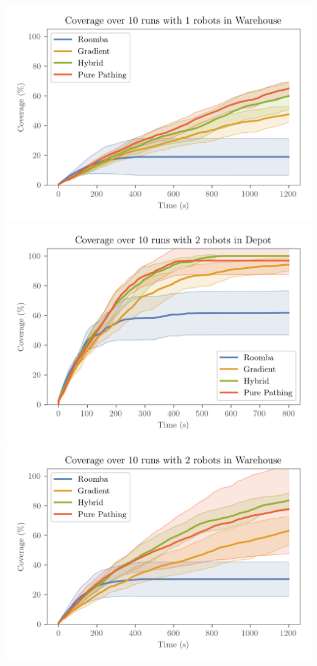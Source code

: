 \hfill
\includegraphics[width=\w]{figures/plots/benchmarks/coverage-over-10-runs-with-1-robots-in-warehouse.png}
\\
\includegraphics[width=\w]{figures/plots/benchmarks/coverage-over-10-runs-with-2-robots-in-depot.png}
\hfill
\includegraphics[width=\w]{figures/plots/benchmarks/coverage-over-10-runs-with-2-robots-in-warehouse.png}
